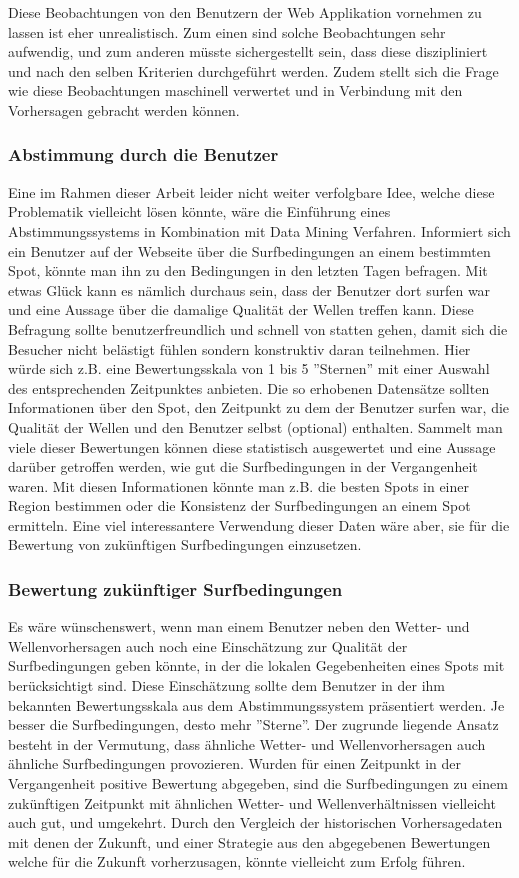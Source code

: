 Diese Beobachtungen von den Benutzern der Web Applikation vornehmen zu
lassen ist eher unrealistisch. Zum einen sind solche Beobachtungen
sehr aufwendig, und zum anderen müsste sichergestellt sein, dass diese
diszipliniert und nach den selben Kriterien durchgeführt werden. Zudem
stellt sich die Frage wie diese Beobachtungen maschinell verwertet und
in Verbindung mit den Vorhersagen gebracht werden können.

\subsubsection{Abstimmung durch die Benutzer}
Eine im Rahmen dieser Arbeit leider nicht weiter verfolgbare Idee,
welche diese Problematik vielleicht lösen könnte, wäre die Einführung
eines Abstimmungssystems in Kombination mit Data Mining
Verfahren. Informiert sich ein Benutzer auf der Webseite über die
Surfbedingungen an einem bestimmten Spot, könnte man ihn zu den
Bedingungen in den letzten Tagen befragen. Mit etwas Glück kann es
nämlich durchaus sein, dass der Benutzer dort surfen war und eine
Aussage über die damalige Qualität der Wellen treffen kann. Diese
Befragung sollte benutzerfreundlich und schnell von statten gehen,
damit sich die Besucher nicht belästigt fühlen sondern konstruktiv
daran teilnehmen. Hier würde sich z.B. eine Bewertungsskala von 1 bis
5 ''Sternen'' mit einer Auswahl des entsprechenden Zeitpunktes
anbieten. Die so erhobenen Datensätze sollten Informationen über den
Spot, den Zeitpunkt zu dem der Benutzer surfen war, die Qualität der
Wellen und den Benutzer selbst (optional) enthalten. Sammelt man viele
dieser Bewertungen können diese statistisch ausgewertet und eine
Aussage darüber getroffen werden, wie gut die Surfbedingungen in der
Vergangenheit waren. Mit diesen Informationen könnte man z.B. die
besten Spots in einer Region bestimmen oder die Konsistenz der
Surfbedingungen an einem Spot ermitteln. Eine viel interessantere
Verwendung dieser Daten wäre aber, sie für die Bewertung von
zukünftigen Surfbedingungen einzusetzen.

\subsubsection{Bewertung zukünftiger Surfbedingungen}
Es wäre wünschenswert, wenn man einem Benutzer neben den Wetter- und
Wellenvorhersagen auch noch eine Einschätzung zur Qualität der
Surfbedingungen geben könnte, in der die lokalen Gegebenheiten eines
Spots mit berücksichtigt sind. Diese Einschätzung sollte dem Benutzer
in der ihm bekannten Bewertungsskala aus dem Abstimmungssystem
präsentiert werden. Je besser die Surfbedingungen, desto mehr
''Sterne''. Der zugrunde liegende Ansatz besteht in der Vermutung,
dass ähnliche Wetter- und Wellenvorhersagen auch ähnliche
Surfbedingungen provozieren. Wurden für einen Zeitpunkt in der
Vergangenheit positive Bewertung abgegeben, sind die Surfbedingungen
zu einem zukünftigen Zeitpunkt mit ähnlichen Wetter- und
Wellenverhältnissen vielleicht auch gut, und umgekehrt. Durch den
Vergleich der historischen Vorhersagedaten mit denen der Zukunft, und
einer Strategie aus den abgegebenen Bewertungen welche für die Zukunft
vorherzusagen, könnte vielleicht zum Erfolg führen.

